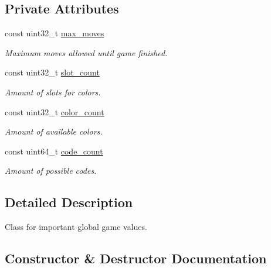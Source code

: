 \subsection*{Private Attributes}
\begin{DoxyCompactItemize}
\item 
const uint32\+\_\+t \hyperlink{classmastermind_1_1logic_1_1_mastermind_ac25c65d6c3b258154b632e5edb77fdb7}{max\+\_\+moves}
\begin{DoxyCompactList}\small\item\em Maximum moves allowed until game finished. \end{DoxyCompactList}\item 
const uint32\+\_\+t \hyperlink{classmastermind_1_1logic_1_1_mastermind_a19f901a04d6175f6437b89cd3600c338}{slot\+\_\+count}
\begin{DoxyCompactList}\small\item\em Amount of slots for colors. \end{DoxyCompactList}\item 
const uint32\+\_\+t \hyperlink{classmastermind_1_1logic_1_1_mastermind_a6fe199e91d3e00de452087f0aedabeff}{color\+\_\+count}
\begin{DoxyCompactList}\small\item\em Amount of available colors. \end{DoxyCompactList}\item 
const uint64\+\_\+t \hyperlink{classmastermind_1_1logic_1_1_mastermind_a66141ba1e71164c2a9c19fbf5d9a6f65}{code\+\_\+count}
\begin{DoxyCompactList}\small\item\em Amount of possible codes. \end{DoxyCompactList}\end{DoxyCompactItemize}


\subsection{Detailed Description}
Class for important global game values. 

\subsection{Constructor \& Destructor Documentation}
\hypertarget{classmastermind_1_1logic_1_1_mastermind_a386b9f51c21ab36c651f86d1671eccfd}{}\label{classmastermind_1_1logic_1_1_mastermind_a386b9f51c21ab36c651f86d1671eccfd} 
